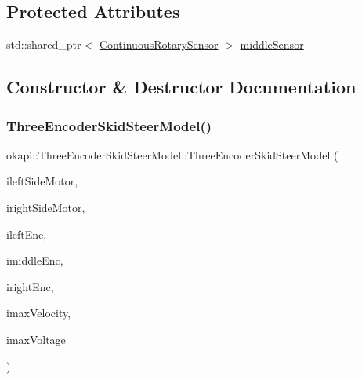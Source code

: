 \subsection*{Protected Attributes}
\begin{DoxyCompactItemize}
\item 
std\+::shared\+\_\+ptr$<$ \mbox{\hyperlink{classokapi_1_1ContinuousRotarySensor}{Continuous\+Rotary\+Sensor}} $>$ \mbox{\hyperlink{classokapi_1_1ThreeEncoderSkidSteerModel_a24ca08fb88096f1f3e5b84974086e972}{middle\+Sensor}}
\end{DoxyCompactItemize}


\subsection{Constructor \& Destructor Documentation}
\mbox{\label{classokapi_1_1ThreeEncoderSkidSteerModel_a27ca581fa9c5f43168d9f52e3dba8d74}} 
\subsubsection{\texorpdfstring{ThreeEncoderSkidSteerModel()}{ThreeEncoderSkidSteerModel()}}
{\footnotesize\ttfamily okapi\+::\+Three\+Encoder\+Skid\+Steer\+Model\+::\+Three\+Encoder\+Skid\+Steer\+Model (\begin{DoxyParamCaption}\item[{std\+::shared\+\_\+ptr$<$ \mbox{\hyperlink{classokapi_1_1AbstractMotor}{Abstract\+Motor}} $>$}]{ileft\+Side\+Motor,  }\item[{std\+::shared\+\_\+ptr$<$ \mbox{\hyperlink{classokapi_1_1AbstractMotor}{Abstract\+Motor}} $>$}]{iright\+Side\+Motor,  }\item[{std\+::shared\+\_\+ptr$<$ \mbox{\hyperlink{classokapi_1_1ContinuousRotarySensor}{Continuous\+Rotary\+Sensor}} $>$}]{ileft\+Enc,  }\item[{std\+::shared\+\_\+ptr$<$ \mbox{\hyperlink{classokapi_1_1ContinuousRotarySensor}{Continuous\+Rotary\+Sensor}} $>$}]{imiddle\+Enc,  }\item[{std\+::shared\+\_\+ptr$<$ \mbox{\hyperlink{classokapi_1_1ContinuousRotarySensor}{Continuous\+Rotary\+Sensor}} $>$}]{iright\+Enc,  }\item[{double}]{imax\+Velocity,  }\item[{double}]{imax\+Voltage }\end{DoxyParamCaption})}

